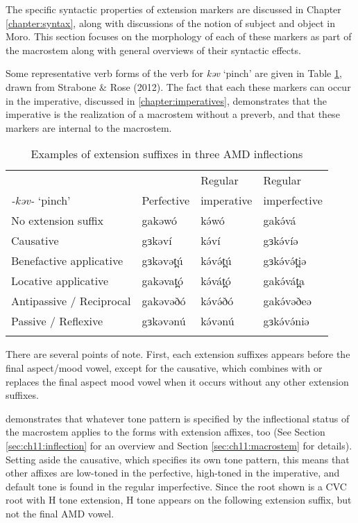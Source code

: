 The specific syntactic properties of extension markers are discussed in Chapter \ref{chapter:syntax}, along with discussions of the notion of subject and object in Moro. This section focuses on the morphology of each of these markers as part of the macrostem along with general overviews of their syntactic effects.

Some representative verb forms of the verb for \textit{kəv} ‘pinch’ are given in Table \ref{tab:ch11:ext1}, drawn from Strabone \& Rose (2012). The fact that each these markers can occur in the imperative, discussed in \ref{chapter:imperatives}, demonstrates that the imperative is the realization of a macrostem without a preverb, and that these markers are internal to the macrostem.

\begin{table}
	\begin{tabular}[t]{llll}
	\lsptoprule
				& 						& {Regular} 	& {Regular} \\
\textit{-kəv-} `pinch'				&		{Perfective}	& {imperative} 	& {imperfective} \\
\midrule 
No extension suffix		&	gakəwó &  kə́wó 			&	 gakə́vá \\
Causative &  gɜkəví &  kə́ví &  gɜkə́víə \\%
Benefactive applicative & gɜkəvət̪ú & kə́və́t̪ú & gɜkə́və́t̪iə\\
Locative applicative & gakəvat̪ó &  kə́vát̪ó & gakə́vát̪a \\
Antipassive / Reciprocal & gakəvəðó &  kə́və́ðó & gakə́vəðeə \\
Passive / Reflexive & gɜkəvənú &  kə́vənú &  gɜkə́və́niə \\
					\lspbottomrule
	\end{tabular}
	\caption{Examples of extension suffixes in three AMD inflections}
	\label{tab:ch11:ext1}
\end{table}
There are several points of note. First, each extension suffixes appears before the final aspect/mood vowel, except for the causative, which combines with or replaces the final aspect mood vowel when it occurs without any other extension suffixes. 

 demonstrates that whatever tone pattern is specified by the inflectional status of the macrostem applies to the forms with extension affixes, too (See Section \ref{sec:ch11:inflection} for an overview and Section \ref{sec:ch11:macrostem} for details). Setting aside the causative, which specifies its own tone pattern, this means that other affixes are low-toned in the perfective, high-toned in the imperative, and default tone is found in the regular imperfective. Since the root shown is a CVC root with H tone extension, H tone appears on the following extension suffix, but not the final AMD vowel.

